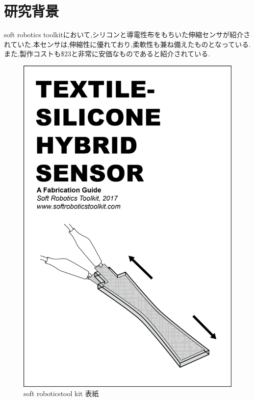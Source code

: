 \section{研究背景}
soft robotics toolkit\cite{MITSoftRobot}において,シリコンと導電性布をもちいた伸縮センサが紹介されていた.本センサは,伸縮性に優れており,柔軟性も兼ね備えたものとなっている.また,製作コストも\$23と非常に安価なものであると紹介されている.
\begin{figure}[h]
    \begin{center}
        \includegraphics[width=0.5\columnwidth,clip]{Photo/BackGround/MITSoftRobotics.eps}
        \caption{soft roboticstool kit 表紙\cite{MITSoftRobot}}
        \label{MITSoftRobot表紙}
    \end{center}
\end{figure}

